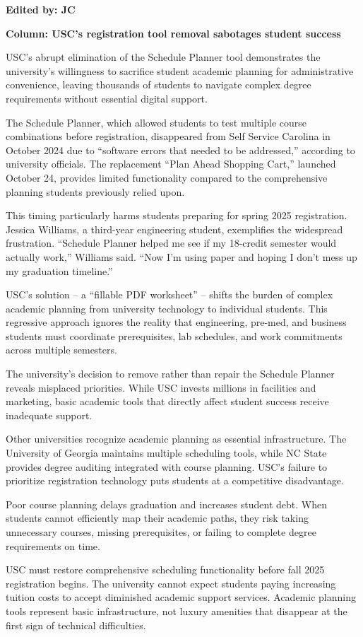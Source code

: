 \documentclass[12pt]{article}
\begin{document}
\newpage
\begin{newversion}
\textbf{Edited by: JC}

\textbf{Column: USC's registration tool removal sabotages student success}

USC's abrupt elimination of the Schedule Planner tool demonstrates the university's willingness to sacrifice student academic planning for administrative convenience, leaving thousands of students to navigate complex degree requirements without essential digital support.

The Schedule Planner, which allowed students to test multiple course combinations before registration, disappeared from Self Service Carolina in October 2024 due to ``software errors that needed to be addressed,'' according to university officials. The replacement ``Plan Ahead Shopping Cart,'' launched October 24, provides limited functionality compared to the comprehensive planning students previously relied upon.

This timing particularly harms students preparing for spring 2025 registration. Jessica Williams, a third-year engineering student, exemplifies the widespread frustration. ``Schedule Planner helped me see if my 18-credit semester would actually work,'' Williams said. ``Now I'm using paper and hoping I don't mess up my graduation timeline.''

USC's solution – a ``fillable PDF worksheet'' – shifts the burden of complex academic planning from university technology to individual students. This regressive approach ignores the reality that engineering, pre-med, and business students must coordinate prerequisites, lab schedules, and work commitments across multiple semesters.

The university's decision to remove rather than repair the Schedule Planner reveals misplaced priorities. While USC invests millions in facilities and marketing, basic academic tools that directly affect student success receive inadequate support.

Other universities recognize academic planning as essential infrastructure. The University of Georgia maintains multiple scheduling tools, while NC State provides degree auditing integrated with course planning. USC's failure to prioritize registration technology puts students at a competitive disadvantage.

Poor course planning delays graduation and increases student debt. When students cannot efficiently map their academic paths, they risk taking unnecessary courses, missing prerequisites, or failing to complete degree requirements on time.

USC must restore comprehensive scheduling functionality before fall 2025 registration begins. The university cannot expect students paying increasing tuition costs to accept diminished academic support services. Academic planning tools represent basic infrastructure, not luxury amenities that disappear at the first sign of technical difficulties.
\end{newversion}
\end{document}
